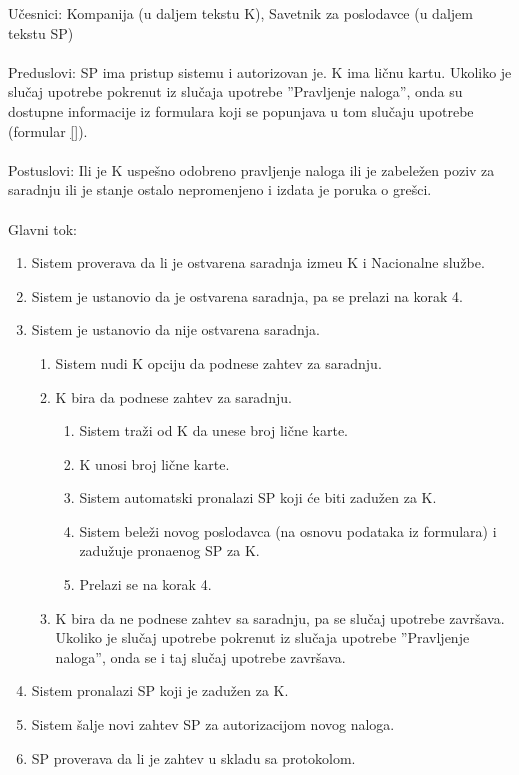 \noindent U\v cesnici: Kompanija (u daljem tekstu K), Savetnik za poslodavce (u daljem tekstu SP)
\\
\\ Preduslovi: SP ima pristup sistemu i autorizovan je. K ima li\v cnu kartu. Ukoliko je slu\v caj upotrebe pokrenut iz slu\v caja upotrebe ''Pravljenje naloga'', onda su dostupne informacije iz formulara koji se popunjava u tom slu\v caju upotrebe (formular \ref{}).
\\
\\ Postuslovi: Ili je K uspe\v sno odobreno pravljenje naloga ili je zabele\v zen poziv za saradnju ili je stanje ostalo nepromenjeno i izdata je poruka o gre\v sci.
\\ 
\\ Glavni tok:
\begin{enumerate}
	\item Sistem proverava da li je ostvarena saradnja izme\dj u K i Nacionalne slu\v zbe.
	\item Sistem je ustanovio da je ostvarena saradnja, pa se prelazi na korak 4.
	\item Sistem je ustanovio da nije ostvarena saradnja.
	\begin{enumerate}
		\item Sistem nudi K opciju da podnese zahtev za saradnju.
		\item K bira da podnese zahtev za saradnju.
		\begin{enumerate}
			\item Sistem tra\v zi od K da unese broj li\v cne karte.
			\item K unosi broj li\v cne karte.
			\item Sistem automatski pronalazi SP koji \' ce biti zadu\v zen za K.
			\item Sistem bele\v zi novog poslodavca (na osnovu podataka iz formulara) i zadu\v zuje prona\dj enog SP za K.
			\item Prelazi se na korak 4.
		\end{enumerate}
		\item K bira da ne podnese zahtev sa saradnju, pa se slu\v caj upotrebe zavr\v sava. Ukoliko je slu\v caj upotrebe pokrenut iz slu\v caja upotrebe ''Pravljenje naloga'', onda se i taj slu\v caj upotrebe zavr\v sava.
	\end{enumerate}
	\item Sistem pronalazi SP koji je zadu\v zen za K.
	\item Sistem \v salje novi zahtev SP za autorizacijom novog naloga.
	\item SP proverava da li je zahtev u skladu sa protokolom.

\end{enumerate}
